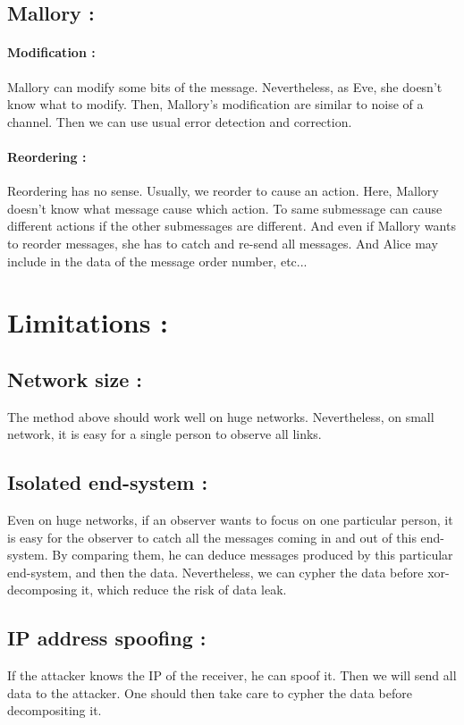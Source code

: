 \documentclass[a4paper, onecolumn, 10pt]{article}
\numberwithin{equation}{section}
\begin{document}
\subsection{Mallory :}
\paragraph{Modification :}
Mallory can modify some bits of the message. Nevertheless, as Eve, she doesn't know what to modify. Then, Mallory's modification are similar to noise of a channel. Then we can use usual error detection and correction.
\paragraph{Reordering :}
Reordering has no sense. Usually, we reorder to cause an action. Here, Mallory doesn't know what message cause which action. To same submessage can cause different actions if the other submessages are different. And even if Mallory wants to reorder messages, she has to catch and re-send all messages. And Alice may include in the data of the message order number, etc...

\section{Limitations :}
\subsection{Network size :}
The method above should work well on huge networks. Nevertheless, on small network, it is easy for a single person to observe all links. 
\subsection{Isolated end-system :}
Even on huge networks, if an observer wants to focus on one particular person, it is easy for the observer to catch all the messages coming in and out of this end-system. By comparing them, he can deduce messages produced by this particular end-system, and then the data. Nevertheless, we can cypher the data before xor-decomposing it, which reduce the risk of data leak.
\subsection{IP address spoofing :}
If the attacker knows the IP of the receiver, he can spoof it. Then we will send all data to the attacker. One should then take care to cypher the data before decompositing it.
\end{document}
